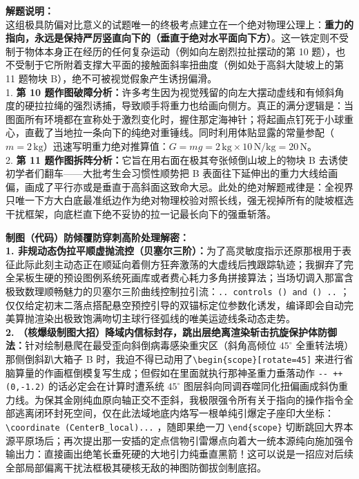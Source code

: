 \documentclass[12pt, a4paper]{ctexrep}
\begin{document}
{\small\color{gray}
\textbf{解题说明：}\\
这组极具防偏对比意义的试题唯一的终极考点建立在一个绝对物理公理上：\textbf{重力的指向，永远是保持严厉竖直向下的（垂直于绝对水平面向下方）}。这一铁定则不受制于物体本身正在经历的任何复杂运动（例如向左剧烈拉扯摆动的第 10 题），也不受制于它所附着支撑大平面的接触面斜率扭曲度（例如处于高斜大陡坡上的第 11 题物块 B），绝不可被视觉假象产生诱拐偏滑。\\
1. \textbf{第 10 题作图破障分析：}许多考生因为视觉残留的向左大摆动虚线和有倾斜角度的硬拉拉绳的强烈诱捕，导致顺手将重力也给画向侧方。真正的满分逻辑是：当图面所有环境都在宣称处于激烈变化时，握住那定海神针；将起画点钉死于小球重心，直截了当地拉一条向下的纯绝对重锤线。同时利用体贴显露的常量参配（$m=2\,\text{kg}$）迅速写明重力绝对推算值：$G = mg = 2\,\text{kg} \times 10\,\text{N/kg} = 20\,\text{N}$。\\
2. \textbf{第 11 题作图拆阵分析：}它旨在用右面在极其夸张倾倒山坡上的物块 B 去诱使初学者们翻车——大批考生会习惯性顺势把 B 表面往下延伸出的重力大线给画偏，画成了平行亦或是垂直于高斜面这致命大忌。此处的绝对解题戒律是：全视界只唯一下方大白底最准纸边作为绝对物理校验对照长线，强无视掉所有的陡坡框选干扰框架，向底栏直下绝不妥协的拉一记最长向下的强垂斩落。
}

\vspace{0.6cm}

{\small\color{blue!70!black}
\textbf{制图（代码）防倾覆防穿刺高阶处理解密：}\\
\textbf{1. 非规动态伪拉平顺虚抛流控（贝塞尔三阶）：}为了高灵敏度指示还原那根用于表征此际此刻主动态正在顺延向着侧方狂奔激荡的大虚线后拽跟踪轨迹；我摒弃了完全呆板生硬的预设图例系统死画库或者费心耗力多角拼接算法；当场切调入那富含极致数理顺畅魅力的贝塞尔三阶曲线控制拉引流：\texttt{.. controls () and () ..} ；仅仅给定初末二落点搭配悬空预控引导的双锚标定位参数化诱发，编译即会自动完美算抛渲染出极致饱满吻切主球行径弧线的唯美运迹线条动态走势。\\
\textbf{2. （核爆级制图大招）降域内信标封存，跳出层绝离渲染斩击抗旋保护体防御法：}针对绘制悬爬在最受歪向斜倒病毒感染重灾区（斜角高倾位 $45^\circ$ 全重转法境）那侧倒斜趴大箱子 B 时，我迫不得已动用了\texttt{\textbackslash begin\{scope\}[rotate=45]} 来进行省脑算量的作画框倒模复写生成；但假如在里面就执行那神圣重力垂落动作 \texttt{-{}- ++(0,-1.2)} 的话必定会在计算时遭系统 $45^\circ$ 图层斜向同调吞噬同化扭偏画成斜伪重力线。为保其金刚纯血原向轴正交不歪斜，我极限强令所有关于指向的操作指令全部逃离闭环封死空间，仅在此法域地底内烙写一根单纯引爆定子座印大坐标：\texttt{\textbackslash coordinate (CenterB\_local)...} ，随即果绝一刀 \texttt{\textbackslash end\{scope\}} 切断跳回大界本源平原场后；再次提出那一安插的定点信物引雷爆点向着大一统本源纯向施加强令输出力：直接画出绝笔长垂死硬的大地引力纯垂直黑箭！这可以说是一招应对后续全部局部偏离干扰法框极其硬核无敌的神图防御拔剑制底招。
}
\end{document}
